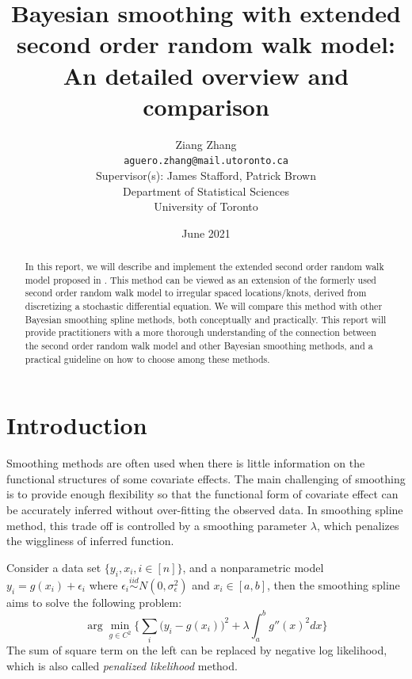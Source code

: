 \documentclass{article}
\title{\textbf{Bayesian smoothing with extended second order random walk model: An detailed overview and comparison}}
\author{
Ziang Zhang \\ \vspace{-0.3cm}\normalsize\texttt{aguero.zhang@mail.utoronto.ca}\\ 
\large
\vspace{0.5cm}
Supervisor(s): James Stafford, Patrick Brown \\ 

\vspace{0.5cm}
Department of Statistical Sciences \\
University of Toronto
}
\date{June 2021}
\begin{document}
\maketitle

\tableofcontents

\newpage

\begin{abstract}
In this report, we will describe and implement the extended second order random walk model proposed in \cite{rw2}. This method can be viewed as an extension of the formerly used second order random walk model to irregular spaced locations/knots, derived from discretizing a stochastic differential equation. We will compare this method with other Bayesian smoothing spline methods, both conceptually and practically. This report will provide practitioners with a more thorough understanding of the connection between the second order random walk model and other Bayesian smoothing methods, and a practical guideline on how to choose among these methods.
\end{abstract}




\section{Introduction}\label{intro}

Smoothing methods are often used when there is little information on the functional structures of some covariate effects. The main challenging of smoothing is to provide enough flexibility so that the functional form of covariate effect can be accurately inferred without over-fitting the observed data. In smoothing spline method, this trade off is controlled by a smoothing parameter $\lambda$, which penalizes the wiggliness of inferred function. 

Consider a data set $\{y_i,x_i, i\in [n]\}$, and a nonparametric model $y_i = g(x_i) + \epsilon_i$ where $\epsilon_i \overset{iid}\sim N(0,\sigma_\epsilon^2)$ and $x_i \in [a,b]$, then the smoothing spline aims to solve the following problem:
\begin{equation}\label{equ:ss}
\arg\min_{g\in C^2} \bigg\{ \sum_i\bigg(y_i-g(x_i)\bigg)^2 + \lambda\int_a^b g''(x)^2 dx \bigg\}
\end{equation}
The sum of square term on the left can be replaced by negative log likelihood, which is also called \textit{penalized likelihood} method.
\end{document}
